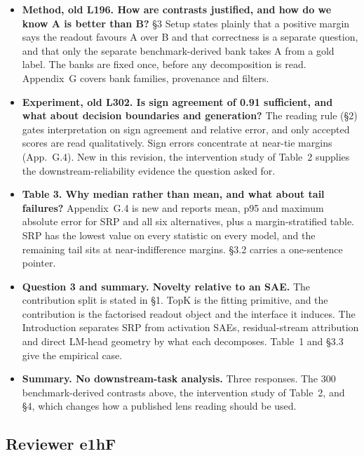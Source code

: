 \documentclass[11pt]{article}
\begin{document}
\begin{itemize}
\item \textbf{Method, old L196. How are contrasts justified, and how do we
know A is better than B?} \S3 Setup states plainly that a
positive margin says the readout favours A over B and that correctness is a
separate question, and that only the separate benchmark-derived bank takes A
from a gold label. The banks are fixed once, before any decomposition is
read. Appendix~G covers bank families, provenance and filters.

\item \textbf{Experiment, old L302. Is sign agreement of 0.91 sufficient, and
what about decision boundaries and generation?} The reading rule (\S2) gates interpretation on sign agreement and relative error, and
only accepted scores are read qualitatively. Sign errors concentrate at
near-tie margins (App.~G.4). New in this revision,
the intervention study of Table~2 supplies the downstream-reliability
evidence the question asked for.

\item \textbf{Table 3. Why median rather than mean, and what about tail
failures?} Appendix~G.4 is new and reports mean, p95 and maximum absolute
error for SRP and all six alternatives, plus a margin-stratified table. SRP
has the lowest value on every statistic on every model, and the remaining
tail sits at near-indifference margins. \S3.2 carries a
one-sentence pointer.

\item \textbf{Question 3 and summary. Novelty relative to an SAE.} The
contribution split is stated in \S1. TopK is the fitting
primitive, and the contribution is the factorised readout object and the
interface it induces. The Introduction separates SRP from activation SAEs,
residual-stream attribution and direct LM-head geometry by what each
decomposes. Table~1 and \S3.3 give the
empirical case.

\item \textbf{Summary. No downstream-task analysis.} Three responses. The 300
benchmark-derived contrasts above, the intervention study of Table~2, and
\S4, which changes how a published lens reading should be used.
\end{itemize}

\subsection*{Reviewer e1hF}
\end{document}
